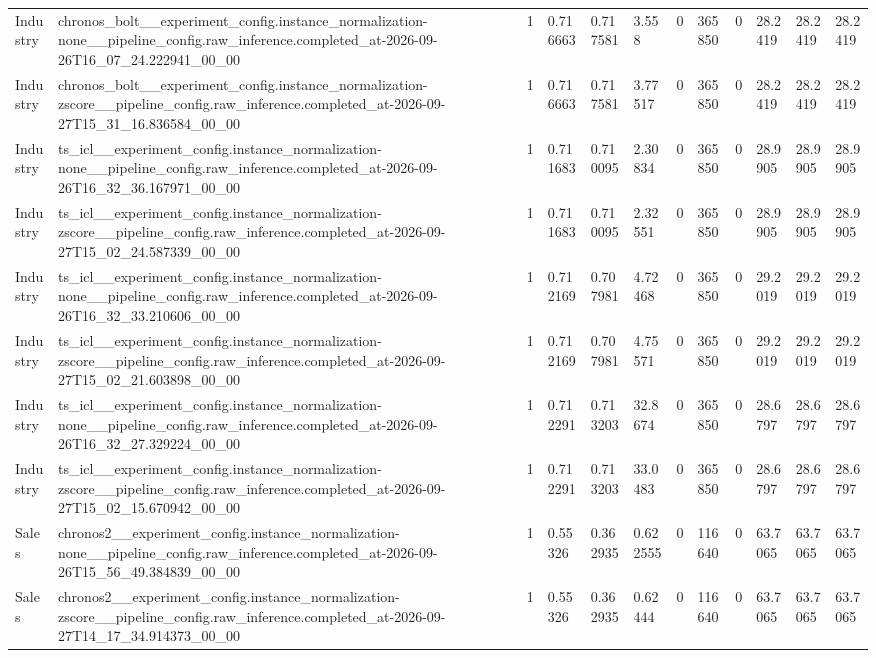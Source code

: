 \begin{tabular}{llllllllllll}
Industry & chronos\_bolt\_\_experiment\_config.instance\_normalization-none\_\_pipeline\_config.raw\_inference.completed\_at-2026-09-26T16\_07\_24.222941\_00\_00 & 1 & 0.716663 & 0.717581 & 3.558 & 0 & 365850 & 0 & 28.2419 & 28.2419 & 28.2419 \\
Industry & chronos\_bolt\_\_experiment\_config.instance\_normalization-zscore\_\_pipeline\_config.raw\_inference.completed\_at-2026-09-27T15\_31\_16.836584\_00\_00 & 1 & 0.716663 & 0.717581 & 3.77517 & 0 & 365850 & 0 & 28.2419 & 28.2419 & 28.2419 \\
Industry & ts\_icl\_\_experiment\_config.instance\_normalization-none\_\_pipeline\_config.raw\_inference.completed\_at-2026-09-26T16\_32\_36.167971\_00\_00 & 1 & 0.711683 & 0.710095 & 2.30834 & 0 & 365850 & 0 & 28.9905 & 28.9905 & 28.9905 \\
Industry & ts\_icl\_\_experiment\_config.instance\_normalization-zscore\_\_pipeline\_config.raw\_inference.completed\_at-2026-09-27T15\_02\_24.587339\_00\_00 & 1 & 0.711683 & 0.710095 & 2.32551 & 0 & 365850 & 0 & 28.9905 & 28.9905 & 28.9905 \\
Industry & ts\_icl\_\_experiment\_config.instance\_normalization-none\_\_pipeline\_config.raw\_inference.completed\_at-2026-09-26T16\_32\_33.210606\_00\_00 & 1 & 0.712169 & 0.707981 & 4.72468 & 0 & 365850 & 0 & 29.2019 & 29.2019 & 29.2019 \\
Industry & ts\_icl\_\_experiment\_config.instance\_normalization-zscore\_\_pipeline\_config.raw\_inference.completed\_at-2026-09-27T15\_02\_21.603898\_00\_00 & 1 & 0.712169 & 0.707981 & 4.75571 & 0 & 365850 & 0 & 29.2019 & 29.2019 & 29.2019 \\
Industry & ts\_icl\_\_experiment\_config.instance\_normalization-none\_\_pipeline\_config.raw\_inference.completed\_at-2026-09-26T16\_32\_27.329224\_00\_00 & 1 & 0.712291 & 0.713203 & 32.8674 & 0 & 365850 & 0 & 28.6797 & 28.6797 & 28.6797 \\
Industry & ts\_icl\_\_experiment\_config.instance\_normalization-zscore\_\_pipeline\_config.raw\_inference.completed\_at-2026-09-27T15\_02\_15.670942\_00\_00 & 1 & 0.712291 & 0.713203 & 33.0483 & 0 & 365850 & 0 & 28.6797 & 28.6797 & 28.6797 \\
Sales & chronos2\_\_experiment\_config.instance\_normalization-none\_\_pipeline\_config.raw\_inference.completed\_at-2026-09-26T15\_56\_49.384839\_00\_00 & 1 & 0.55326 & 0.362935 & 0.622555 & 0 & 116640 & 0 & 63.7065 & 63.7065 & 63.7065 \\
Sales & chronos2\_\_experiment\_config.instance\_normalization-zscore\_\_pipeline\_config.raw\_inference.completed\_at-2026-09-27T14\_17\_34.914373\_00\_00 & 1 & 0.55326 & 0.362935 & 0.62444 & 0 & 116640 & 0 & 63.7065 & 63.7065 & 63.7065 \\

\end{tabular}
